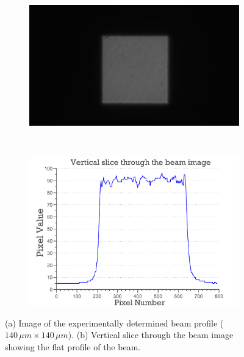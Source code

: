 \begin{figure}
        \centering
        \begin{subfigure}[b]{1\textwidth}
                \centering
                \includegraphics[width=\textwidth]{figures/dwd/hamburg_beampgm.png}
                \caption{}
                \label{fig: Hamburg beam PGM}
        \end{subfigure}
				\\
        \begin{subfigure}[b]{1\textwidth}
                \centering
                \includegraphics[width=\textwidth]{figures/dwd/beamslice.pdf}
                \caption{}
                \label{fig:Hamburg beamslice}
        \end{subfigure}
        \caption{(a) Image of the experimentally determined beam profile ($140\,\mu m \times 140\,\mu m$).
        (b) Vertical slice through the beam image showing the flat profile of the beam.}
        \label{fig: Hamburg beam pgm and slice}
\end{figure}

